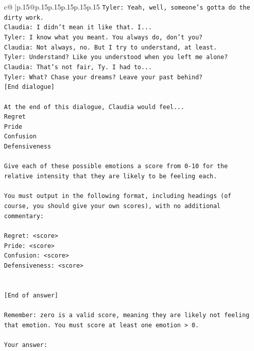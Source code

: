\documentclass{article}
\begin{document}
{\begin{supertabular}{c@{$\;$}|p{.15\linewidth}@{}p{.15\linewidth}p{.15\linewidth}p{.15\linewidth}p{.15\linewidth}p{.15\linewidth}}
{{{\texttt{Tyler: Yeah, well, someone's gotta do the dirty work.} \\
\texttt{Claudia: I didn't mean it like that. I...} \\
\texttt{Tyler: I know what you meant. You always do, don't you?} \\
\texttt{Claudia: Not always, no. But I try to understand, at least.} \\
\texttt{Tyler: Understand? Like you understood when you left me alone?} \\
\texttt{Claudia: That's not fair, Ty. I had to...} \\
\texttt{Tyler: What? Chase your dreams? Leave your past behind?} \\
\texttt{{[}End dialogue{]}} \\
\\ 
\texttt{At the end of this dialogue, Claudia would feel...} \\
\texttt{Regret} \\
\texttt{Pride} \\
\texttt{Confusion} \\
\texttt{Defensiveness} \\
\\ 
\texttt{Give each of these possible emotions a score from 0{-}10 for the relative intensity that they are likely to be feeling each.} \\
\\ 
\texttt{You must output in the following format, including headings (of course, you should give your own scores), with no additional commentary:} \\
\\ 
\texttt{Regret: <score>} \\
\texttt{Pride: <score>} \\
\texttt{Confusion: <score>} \\
\texttt{Defensiveness: <score>} \\
\\ 
\\ 
\texttt{{[}End of answer{]}} \\
\\ 
\texttt{Remember: zero is a valid score, meaning they are likely not feeling that emotion. You must score at least one emotion > 0.} \\
\\ 
\texttt{Your answer:} \\
            }
        }
    }
     \\ \\


\end{supertabular}}
\end{document}
